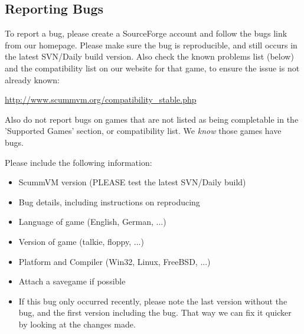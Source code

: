 \subsection{Reporting Bugs} \label{sect-reporting-bugs}

To report a bug, please create a SourceForge account and follow the bugs
link from our homepage. Please make sure the bug is reproducible, and
still occurs in the latest SVN/Daily build version. Also check the known
problems list (below) and the compatibility list on our website for that
game, to ensure the issue is not already known:

  \url{http://www.scummvm.org/compatibility_stable.php}

Also do not report bugs on games that are not listed as being completable
in the 'Supported Games' section, or compatibility list. We \textit{know} those
games have bugs.

Please include the following information:
\begin{itemize}
\item ScummVM version (PLEASE test the latest SVN/Daily build)
\item Bug details, including instructions on reproducing
\item Language of game (English, German, ...)
\item Version of game (talkie, floppy, ...)
\item Platform and Compiler (Win32, Linux, FreeBSD, ...)
\item Attach a savegame if possible
\item If this bug only occurred recently, please note the last
          version without the bug, and the first version including
          the bug. That way we can fix it quicker by looking at the
          changes made.
\end{itemize}


